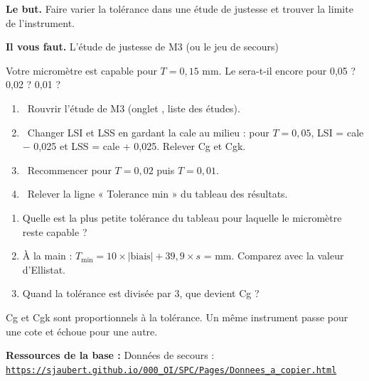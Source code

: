 \documentclass[10pt,a4paper]{article}
\begin{document}
\thispagestyle{fancy}
\begin{tcolorbox}[boite]\textbf{Le but.} Faire varier la tolérance dans une étude de justesse et trouver la limite de l'instrument.\par\textbf{Il vous faut.} L'étude de justesse de M3 (ou le jeu de secours)\end{tcolorbox}
\begin{tcolorbox}[pred]Votre micromètre est capable pour $T = 0{,}15$ mm. Le sera-t-il encore pour 0,05 ? 0,02 ? 0,01 ?\reponse\end{tcolorbox}
\begin{enumerate}[label=\textcolor{cyan}{\textbf{\arabic*.}},leftmargin=15pt,itemsep=1.5pt]
\item \tagE\ Rouvrir l'étude  de M3 (onglet , liste des études).
\item \tagE\ Changer LSI et LSS en gardant la cale au milieu : pour $T = 0{,}05$, LSI = cale $-$ 0,025 et LSS = cale + 0,025. Relever Cg et Cgk.
\item \tagE\ Recommencer pour $T = 0{,}02$ puis $T = 0{,}01$.
\item \tagE\ Relever la ligne « Tolerance min » du tableau des résultats.
\end{enumerate}
\par
{}
\begin{enumerate}[label=\textcolor{cyan}{\textbf{Q\arabic*.}},leftmargin=22pt]
\item Quelle est la plus petite tolérance du tableau pour laquelle le micromètre reste capable ?\reponse[1]
\item À la main : $T_{\min} = 10 \times |\text{biais}| + 39{,}9 \times s$ = \champ{20mm} mm. Comparez avec la valeur d'Ellistat.\reponse[1]
\item Quand la tolérance est divisée par 3, que devient Cg ?\reponse[1]
\end{enumerate}
\begin{tcolorbox}[retenir]Cg et Cgk sont proportionnels à la tolérance. Un même instrument passe pour une cote et échoue pour une autre.\end{tcolorbox}
\vfill{\footnotesize\color{uimm}\textbf{Ressources de la base :} Données de secours : \href{https://sjaubert.github.io/000_OI/SPC/Pages/Donnees_a_copier.html\#instr}{\nolinkurl{https://sjaubert.github.io/000_OI/SPC/Pages/Donnees_a_copier.html}}}
\end{document}
